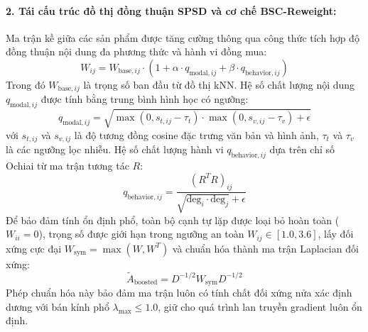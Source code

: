 \paragraph{2. Tái cấu trúc đồ thị đồng thuận SPSD và cơ chế BSC-Reweight:}
Ma trận kề giữa các sản phẩm được tăng cường thông qua công thức tích hợp độ đồng thuận nội dung đa phương thức và hành vi đồng mua:
\begin{equation}
W_{ij} = W_{\text{base}, ij} \cdot \left(1 + \alpha \cdot q_{\text{modal}, ij} + \beta \cdot q_{\text{behavior}, ij}\right)
\end{equation}
Trong đó $W_{\text{base}, ij}$ là trọng số ban đầu từ đồ thị kNN. Hệ số chất lượng nội dung $q_{\text{modal}, ij}$ được tính bằng trung bình hình học có ngưỡng:
\begin{equation}
q_{\text{modal}, ij} = \sqrt{\max(0, s_{t, ij} - \tau_t) \cdot \max(0, s_{v, ij} - \tau_v) + \epsilon}
\end{equation}
với $s_{t, ij}$ và $s_{v, ij}$ là độ tương đồng cosine đặc trưng văn bản và hình ảnh, $\tau_t$ và $\tau_v$ là các ngưỡng lọc nhiễu. Hệ số chất lượng hành vi $q_{\text{behavior}, ij}$ dựa trên chỉ số Ochiai từ ma trận tương tác $R$:
\begin{equation}
q_{\text{behavior}, ij} = \frac{(R^T R)_{ij}}{\sqrt{\text{deg}_i \cdot \text{deg}_j} + \epsilon}
\end{equation}
Để bảo đảm tính ổn định phổ, toàn bộ cạnh tự lặp được loại bỏ hoàn toàn ($W_{ii} = 0$), trọng số được giới hạn trong ngưỡng an toàn $W_{ij} \in [1.0, 3.6]$, lấy đối xứng cực đại $W_{\text{sym}} = \max(W, W^T)$ và chuẩn hóa thành ma trận Laplacian đối xứng:
\begin{equation}
\tilde{A}_{\text{boosted}} = D^{-1/2} W_{\text{sym}} D^{-1/2}
\end{equation}
Phép chuẩn hóa này bảo đảm ma trận luôn có tính chất đối xứng nửa xác định dương với bán kính phổ $\lambda_{\max} \le 1.0$, giữ cho quá trình lan truyền gradient luôn ổn định.

